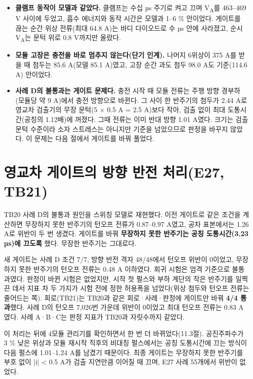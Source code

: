 \begin{itemize}
\item \textbf{클램프 동작이 모델과 같았다.} 클램프는 수십 µs 주기로 켜고 끄며 V\textsubscript{A}를 463–469 V 사이에 두었고, 흡수 에너지와 동작 시간은 모델과 1–6 \% 안이었다. 게이트를 끊는 순간 위상 전류(최대 64.8 A)는 바디 다이오드로 수 µs 안에 사라졌고, 순시 V\textsubscript{A}는 문턱 위로 0.8 V까지만 올랐다.
\item \textbf{모듈 고장은 충전을 바로 멈추지 않는다(단기 인계).} 나머지 6위상이 375 A를 받을 때 첨두는 85.6 A(모델 85.1 A)였고, 고장 순간 과도 첨두 98.0 A도 기준(114.6 A) 안이었다.
\item \textbf{사례 D의 불통과는 게이트 문제다.} 충전 시작 때 모듈 전류는 주행 방향 경부하(모듈당 약 9 A)에서 충전 방향으로 바뀐다. 그 사이 한 반주기의 첨두가 2.44 A로 영교차 검출기의 무장 문턱(5 × 0.5 A = 2.5 A)보다 작아, 검출 없이 최대 도통시간(공칭의 1.12배)에 꺼졌다. 그때 전류는 이미 반대 방향 1.01 A였다. 크기는 검출 문턱 수준이라 소자 스트레스는 아니지만 기준을 넘었으므로 판정을 바꾸지 않았다. 이 문제는 다음 절에서 게이트를 바꿔 풀었다.
\end{itemize}

\section{영교차 게이트의 방향 반전 처리(E27, TB21)}

TB20 사례 D의 불통과 원인을 스위칭 모델로 재현했다. 이전 게이트로 같은 조건을 계산하면 무장하지 못한 반주기의 턴오프 전류가 0.87–0.97 A였고, 공차 표본에서는 1.26 A로 위반이 두 번 생겼다. 게이트를 바꿔 \textbf{무장하지 못한 반주기는 공칭 도통시간(3.23 µs)에 끄도록} 했다. 무장한 반주기는 그대로다.

새 게이트는 사례 D 조건 7/7, 방향 반전 격자 48/48에서 턴오프 위반이 0이었고, 무장하지 못한 반주기의 턴오프 전류는 0.48 A 이하였다. 회귀 시험은 엄격 기준으로 불통과였다. 판정이 바뀐 시험은 없었지만, 시작 첫 펄스와 부하 계단의 작은 반주기를 일찍 끈 데서 지표 차 두 가지가 시험 전에 정한 허용폭을 넘었다(위상 첨두와 턴오프 전류는 줄어드는 쪽). 회로(TB21)는 TB20과 같은 회로·사례·판정에 게이트만 바꿔 \textbf{4/4 통과}했다. 사례 D의 턴오프 7,026번 가운데 위반이 0이었고 최대 턴오프 전류는 0.83 A였다. 사례 A·B·C는 판정 지표가 TB20과 자릿수까지 같았다.

이 처리는 뒤에 4모듈 관리기를 확인하면서 한 번 더 바뀌었다(11.3절). 공진주파수가 3 \% 낮은 위상과 모듈 재시작 직후의 비대칭 펄스에서는 공칭 도통시간에 끄는 방식이 다음 펄스에 1.01–1.24 A를 남겼기 때문이다. 최종 게이트는 무장하지 못한 반주기를 부호 없이 |i| < 0.5 A가 검출 지연만큼 이어질 때 끄며, E27 사례 55개에서 위반이 없었다.

